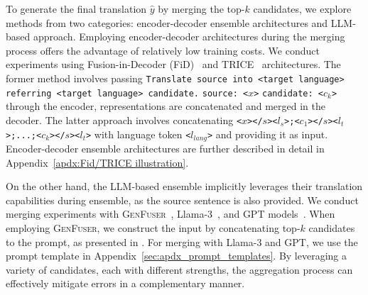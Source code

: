 To generate the final translation $\hat{y}$ by merging the top-$\textit{k}$ candidates, we explore methods from two categories: encoder-decoder ensemble architectures and LLM-based approach.
Employing encoder-decoder architectures during the merging process offers the advantage of relatively low training costs.
We conduct experiments using Fusion-in-Decoder (FiD)~\cite{fid} and TRICE~\cite{trice} architectures.
The former method involves passing 
\texttt{Translate source into <target language>}
\texttt{referring <target language> candidate.}
\texttt{source: <$x$>}
\texttt{candidate: <$c_{k}$>}
through the encoder, representations are concatenated and merged in the decoder.
The latter approach involves concatenating \texttt{<$x$></$s$><$l_{s}$>;<$c_{1}$></$s$><$l_{t}$>;...;<$c_{k}$></$s$><$l_{t}$>} with language token \texttt{<$l_{lang}$>} and providing it as input.
Encoder-decoder ensemble architectures are further described in detail in Appendix~\ref{apdx:Fid/TRICE illustration}.


On the other hand, the LLM-based ensemble implicitly leverages their translation capabilities during ensemble, as the source sentence is also provided.
We conduct merging experiments with \textsc{GenFuser}~\cite{llm-blender}, Llama-3~\cite{llama3modelcard}, and GPT models~\cite{gpt3.5, gpt4, gpt4o}. 
When employing \textsc{GenFuser}, we construct the input by concatenating top-\textit{$k$} candidates to the prompt, as presented in \citet{llm-blender}.
For merging with Llama-3 and GPT, we use the prompt template in Appendix~\ref{sec:apdx_prompt_templates}.
By leveraging a variety of candidates, each with different strengths, the aggregation process can effectively mitigate errors in a complementary manner.